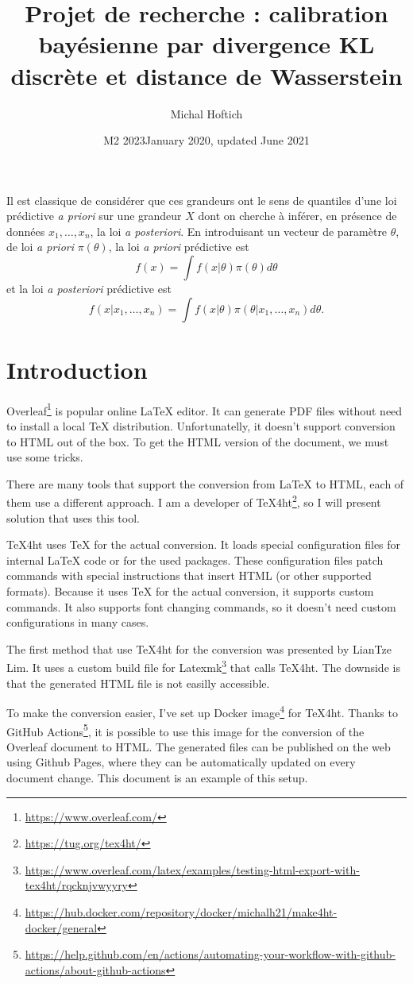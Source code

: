 \documentclass{article}
\title{Projet de recherche : calibration bay\'esienne par divergence KL discr\`ete et distance de Wasserstein}
\date{M2 2023}
\author{Michal Hoftich}
\date{January 2020, updated June 2021}
\newcommand{\1}{\mathbbm{1}}
\newcommand\footurl[1]{\footnote{\url{#1}}}
\newcommand\urllink[2]{#1\footurl{#2}}
\begin{document}
\maketitle

Il est classique de consid\'erer que ces grandeurs ont le sens de quantiles d'une loi pr\'edictive {\it a priori} sur une grandeur $X$ dont on cherche \`a inf\'erer, en pr\'esence de donn\'ees $x_1,\ldots,x_n$, la loi {\it a posteriori}. En introduisant un vecteur de param\`etre $\theta$, de loi {\it a priori} $\pi(\theta)$, la loi {\it a priori} pr\'edictive est
$$
f(x)=\int f(x|\theta) \pi(\theta) d \theta
$$
et la loi {\it a posteriori} pr\'edictive est
$$
f(x|x_1,\ldots,x_n)=\int f(x|\theta) \pi(\theta|x_1,\ldots,x_n) d \theta.
$$


\section{Introduction}

\urllink{Overleaf}{https://www.overleaf.com/} is popular online \LaTeX{}
editor. It can generate PDF files 
without need to install a local \TeX{} distribution. Unfortunatelly, it doesn't
support conversion to HTML out of the box. To get the HTML version of the
document, we must use some tricks.

There are many tools that support the conversion from \LaTeX{} to HTML, each of
them use a different approach. I am a developer of
\urllink{\TeX4ht}{https://tug.org/tex4ht/}, so I will present solution that
uses this tool. 

\TeX4ht uses \TeX{} for the actual conversion. It loads special configuration
files for internal \LaTeX{} code or for the used packages. These configuration
files patch commands with special instructions that insert HTML (or other
supported formats). Because it uses \TeX{} for the actual conversion, it
supports custom commands. It also supports font changing commands, so  it
doesn't need custom configurations in many cases.

The first method that use \TeX4ht for the conversion was presented by LianTze
Lim. It uses a custom build file for
\urllink{Latexmk}{https://www.overleaf.com/latex/examples/testing-html-export-with-tex4ht/rqcknjvwyyry} 
that calls \TeX4ht. The downside is that the generated HTML file is not easilly accessible.  

To make the conversion easier, I've set up \urllink{Docker image}{https://hub.docker.com/repository/docker/michalh21/make4ht-docker/general} for \TeX4ht. 
Thanks to \urllink{GitHub Actions}{https://help.github.com/en/actions/automating-your-workflow-with-github-actions/about-github-actions}, 
it is possible to use this image for the conversion of the Overleaf document to HTML. 
The generated files can be published on the web using Github Pages, where they can be automatically 
updated on every document change. This document is an example of this setup.
\end{document}
